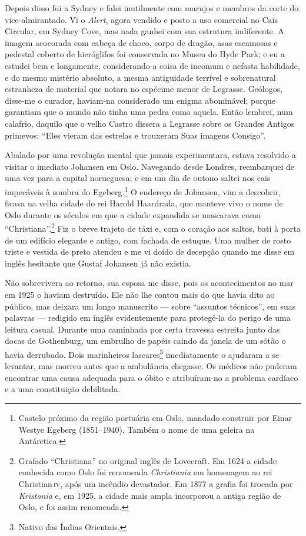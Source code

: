 Depois disso fui a Sydney e falei inutilmente com marujos e membros da
corte do vice-almirantado. Vi o \emph{Alert}, agora vendido e posto a
uso comercial no Cais Circular, em Sydney Cove, mas nada ganhei com sua
estrutura indiferente. A imagem acocorada com cabeça de choco, corpo de
dragão, asas escamosas e pedestal coberto de hieróglifos foi conservada
no Museu do Hyde Park; e eu a estudei bem e longamente, considerando-a
coisa de incomum e nefasta habilidade, e do mesmo mistério absoluto, a
mesma antiguidade terrível e sobrenatural estranheza de material que
notara no espécime menor de Legrasse. Geólogos, disse-me o curador,
haviam-na considerado um enigma abominável; porque garantiam que o mundo
não tinha uma pedra como aquela. Então lembrei, num calafrio, daquilo
que o velho Castro dissera a Legrasse sobre os Grandes Antigos primevos:
``Eles vieram das estrelas e trouxeram Suas imagens Consigo''.

Abalado por uma revolução mental que jamais experimentara, estava
resolvido a visitar o imediato Johansen em Oslo. Navegando desde
Londres, reembarquei de uma vez para a capital norueguesa; e em um dia
de outono saltei nos cais impecáveis à sombra do Egeberg.\footnote{Castelo
  próximo da região portuária em Oslo, mandado construir por Einar
  Westye Egeberg (1851--1940). Também o nome de uma geleira na
  Antárctica.} O endereço de Johansen, vim a descobrir, ficava na velha
cidade do rei Harold Haardrada, que manteve vivo o nome de Oslo durante
os séculos em que a cidade expandida se mascarava como
``Christiana''.\footnote{Grafado ``Christiana'' no original inglês de
  Lovecraft. Em 1624 a cidade conhecida como Oslo foi renomeada
  \emph{Christiania} em homenagem ao rei Christian\,\textsc{iv}, após um incêndio
  devastador. Em 1877 a grafia foi trocada por \emph{Kristania} e, em
  1925, a cidade mais ampla incorporou a antiga região de Oslo, e foi
  assim renomeada.} Fiz o breve trajeto de táxi e, com o coração aos
saltos, bati à porta de um edifício elegante e antigo, com fachada de
estuque. Uma mulher de rosto triste e vestida de preto atendeu e me vi
doído de decepção quando me disse em inglês hesitante que Gustaf
Johansen já não existia.

Não sobrevivera ao retorno, sua esposa me disse, pois os
acontecimentos no mar em 1925 o haviam destruído. Ele não lhe contou
mais do que havia dito ao público, mas deixara um longo manuscrito ---
sobre ``assuntos técnicos'', em suas palavras --- redigido em inglês
evidentemente para protegê-la do perigo de uma leitura casual. Durante
uma caminhada por certa travessa estreita junto das docas de Gothenburg,
um embrulho de papéis caindo da janela de um sótão o havia derrubado.
Dois marinheiros lascares\footnote{Nativo das Índias Orientais.}
imediatamente o ajudaram a se levantar, mas morreu antes que a
ambulância chegasse. Os médicos não puderam encontrar uma causa adequada
para o óbito e atribuíram-no a problema cardíaco e a uma constituição
debilitada.

